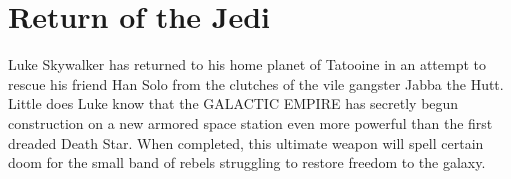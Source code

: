\chapter{Return of the Jedi}
Luke Skywalker has returned to his home planet of Tatooine 
in an attempt to rescue his friend Han Solo from the 
clutches of the vile gangster Jabba the Hutt.  Little does 
Luke know that the GALACTIC EMPIRE has secretly begun 
construction on a new armored space station even more 
powerful than the first dreaded Death Star.  When completed, 
this ultimate weapon will spell certain doom for the small 
band of rebels struggling to restore freedom to the galaxy.

\lipsum[1-10]
\cite{EICHTEN_1980}
